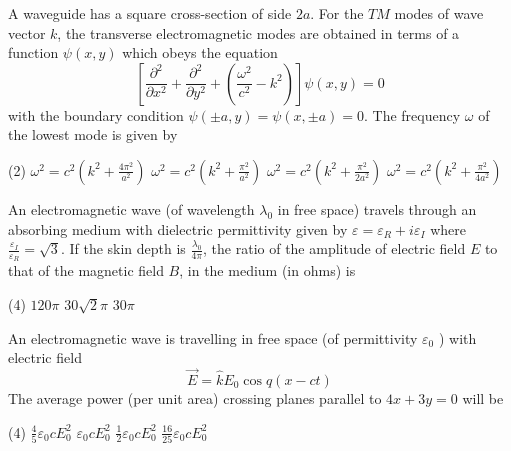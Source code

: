 \begin{enumerate}
\begin{minipage}{\textwidth}
	\item A waveguide has a square cross-section of side $2 a$. For the $T M$ modes of wave vector $k$, the transverse electromagnetic modes are obtained in terms of a function $\psi(x, y)$ which obeys the equation
	$$
	\left[\frac{\partial^{2}}{\partial x^{2}}+\frac{\partial^{2}}{\partial y^{2}}+\left(\frac{\omega^{2}}{c^{2}}-k^{2}\right)\right] \psi(x, y)=0
	$$
	with the boundary condition $\psi(\pm a, y)=\psi(x, \pm a)=0$. The frequency $\omega$ of the lowest mode is given by
\end{minipage}
\begin{tasks}(2)
	\task[\textbf{A.}] $\omega^{2}=c^{2}\left(k^{2}+\frac{4 \pi^{2}}{a^{2}}\right)$
	\task[\textbf{B.}]$\omega^{2}=c^{2}\left(k^{2}+\frac{\pi^{2}}{a^{2}}\right)$
	\task[\textbf{C.}]$\omega^{2}=c^{2}\left(k^{2}+\frac{\pi^{2}}{2 a^{2}}\right)$
	\task[\textbf{D.}]$\omega^{2}=c^{2}\left(k^{2}+\frac{\pi^{2}}{4 a^{2}}\right)$
\end{tasks}
\begin{minipage}{\textwidth}
	\item An electromagnetic wave (of wavelength $\lambda_{0}$ in free space) travels through an absorbing medium with dielectric permittivity given by $\varepsilon=\varepsilon_{R}+i \varepsilon_{I}$ where $\frac{\varepsilon_{I}}{\varepsilon_{R}}=\sqrt{3}$. If the skin depth is $\frac{\lambda_{0}}{4 \pi}$, the ratio of the amplitude of electric field $E$ to that of the magnetic field $B$, in the medium (in ohms) is
\end{minipage}
\begin{tasks}(4)
	\task[\textbf{A.}] $120 \pi$
	\task[\textbf{C.}]$30 \sqrt{2} \pi$
	\task[\textbf{D.}] $30 \pi$
\end{tasks}
\begin{minipage}{\textwidth}
	\item An electromagnetic wave is travelling in free space (of permittivity $\varepsilon_{0}$ ) with electric field
	$$
	\vec{E}=\hat{k} E_{0} \cos q(x-c t)
	$$
	The average power (per unit area) crossing planes parallel to $4 x+3 y=0$ will be
\end{minipage}
\begin{tasks}(4)
	\task[\textbf{A.}] $\frac{4}{5} \varepsilon_{0} c E_{0}^{2}$
	\task[\textbf{B.}]$\varepsilon_{0} c E_{0}^{2}$
	\task[\textbf{C.}]$\frac{1}{2} \varepsilon_{0} c E_{0}^{2}$
	\task[\textbf{D.}] $\frac{16}{25} \varepsilon_{0} c E_{0}^{2}$
\end{tasks}


\end{enumerate}
